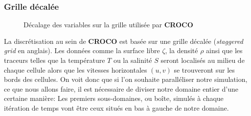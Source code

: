 \subsubsection{Grille décalée}
\begin{figure}	
\centering
	\caption{Décalage des variables sur la grille utilisée par \textbf{CROCO}}
\end{figure}
La discrétisation au sein de \textbf{CROCO} est basée sur une grille décalée (\textit{staggered grid} en anglais). Les données comme la surface libre $\zeta$, la densité $\rho$ ainsi que les traceurs telles que la température $T$ ou la salinité $S$ seront localisés au milieu de chaque cellule alors que les vitesses horizontales $(u,v)$ se trouveront sur les bords des cellules. On voit donc que si l'on souhaite paralléliser notre simulation, ce que nous allons faire, il est nécessaire de diviser notre domaine entier d'une certaine manière: Les premiers sous-domaines, ou boîte, simulés à chaque itération de temps vont être ceux situés en bas à gauche de notre domaine.

